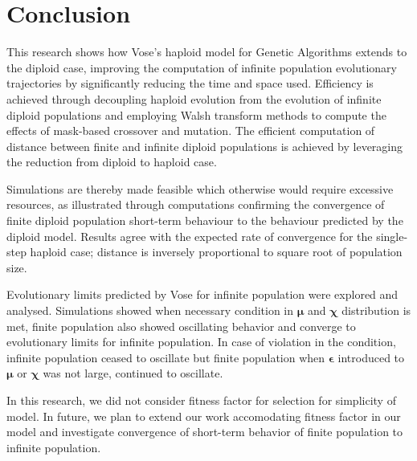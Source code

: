 \chapter{Conclusion}
This research shows how Vose's haploid model for Genetic Algorithms
extends to the diploid case, improving the computation of infinite
population evolutionary trajectories by significantly reducing the
time and space used.  Efficiency is achieved through decoupling
haploid evolution from the evolution of infinite diploid populations
and employing Walsh transform methods to compute the effects of
mask-based crossover and mutation.  The efficient computation of
distance between finite and infinite diploid populations is achieved
by leveraging the reduction from diploid to haploid case.

Simulations are thereby made feasible which otherwise would require
excessive resources, as illustrated through computations confirming
the convergence of finite diploid population short-term behaviour to
the behaviour predicted by the diploid model. Results agree with the
expected rate of convergence for the single-step haploid case;
distance is inversely proportional to square root of population size.

Evolutionary limits predicted by Vose for infinite population were explored and analysed. 
Simulations showed when necessary condition in $\bm{\mu}$ and $\bm{\chi}$ distribution is met, 
finite population also showed oscillating behavior and converge to evolutionary limits for 
infinite population. In case of violation in the condition, infinite population ceased 
to oscillate but finite population when $\bm{\epsilon}$ introduced to $\bm{\mu}$ or $\bm{\chi}$ 
was not large, continued to oscillate.

In this research, we did not consider fitness factor for selection for simplicity of model. 
In future, we plan to extend our work accomodating fitness factor in our model and investigate 
convergence of short-term behavior of finite population to infinite population.


